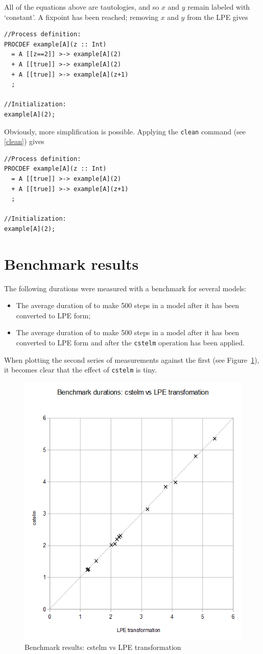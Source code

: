 All of the equations above are tautologies, and so $x$ and $y$ remain labeled with `constant'.
A fixpoint has been reached; removing $x$ and $y$ from the LPE gives

\begin{lstlisting}
//Process definition:
PROCDEF example[A](z :: Int)
  = A [[z==2]] >-> example[A](2)
  + A [[true]] >-> example[A](2)
  + A [[true]] >-> example[A](z+1)
  ;

//Initialization:
example[A](2);
\end{lstlisting}

Obviously, more simplification is possible.
Applying the \texttt{clean} command (see \ref{clean}) gives

\begin{lstlisting}
//Process definition:
PROCDEF example[A](z :: Int)
  = A [[true]] >-> example[A](2)
  + A [[true]] >-> example[A](z+1)
  ;

//Initialization:
example[A](2);
\end{lstlisting}

\section{Benchmark results}

The following durations were measured with a benchmark for several models:
\begin{itemize}
\item The average duration of \txs{} to make 500 steps in a model after it has been converted to LPE form;
\item The average duration of \txs{} to make 500 steps in a model after it has been converted to LPE form and after the \texttt{cstelm} operation has been applied.
\end{itemize}

When plotting the second series of measurements against the first (see Figure~\ref{cstelm-vs-lpe-only:fig}), it becomes clear that the effect of \texttt{cstelm} is tiny.

\begin{figure}[!ht]
\begin{center}
\includegraphics[width=0.7\linewidth]{charts/cstelm-vs-lpe-only}
\caption{Benchmark results: cstelm vs LPE transformation}
\label{cstelm-vs-lpe-only:fig}
\end{center}
\end{figure}

